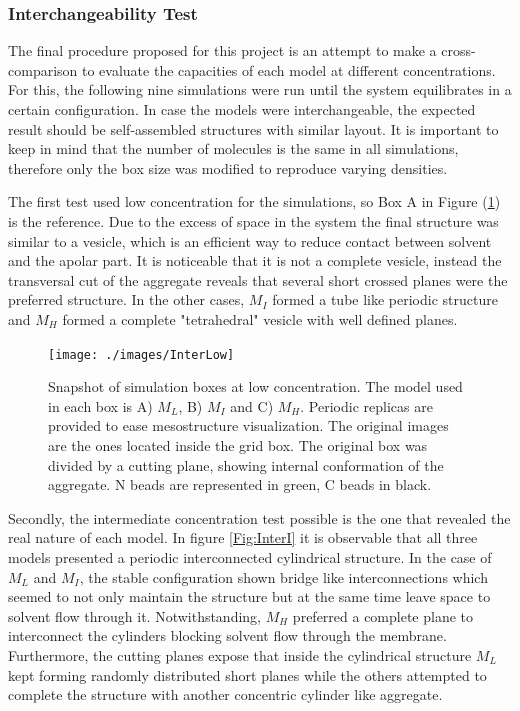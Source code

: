\documentclass[10pt,a4paper,twoside]{article}
\begin{document}
	
\subsubsection{Interchangeability Test }

The final procedure proposed for this project is an attempt to make a cross-comparison to evaluate the capacities of each model at different concentrations. For this, the following nine simulations were run until the system equilibrates in a certain configuration. In case the models were interchangeable, the expected result should be self-assembled structures with similar layout. It is important to keep in mind  that the number of molecules is the same in all simulations, therefore only the box size was modified to reproduce varying densities.

 The first test used low concentration for the simulations, so Box A in Figure (\ref{Fig:InterLow}) is the reference. Due to the excess of space in the system the final structure was similar to  a vesicle, which is an efficient way to reduce contact between solvent and the apolar part. It is noticeable that it is not a complete vesicle, instead the transversal cut of the aggregate reveals that several short crossed planes were the preferred structure. In the other cases, $M_I$ formed a tube like periodic structure and $M_H$ formed a complete "tetrahedral" vesicle with well defined planes.

\begin{figure}[H]
  \begin{center}
	\texttt{[image: ./images/InterLow]}
	\caption{Snapshot of simulation boxes at low concentration. The model used in each box is A) $M_L$, B) $M_I$ and C) $M_H$. Periodic replicas are provided to ease mesostructure visualization. The original images are the ones located inside the grid box. The original box was divided by a cutting plane, showing internal conformation of the aggregate.  N beads are represented in green, C beads in black.}
	\label{Fig:InterLow}
  \end{center}
\end{figure} 

Secondly, the intermediate concentration test possible is the one that revealed the real nature of each model. In figure \ref{Fig:InterI} it is observable that all three models presented a periodic interconnected cylindrical structure. In the case of $M_L$ and $M_I$, the stable configuration shown bridge like interconnections which seemed to not only maintain the structure but at the same time leave space to solvent flow through it. Notwithstanding, $M_H$ preferred a complete plane to interconnect the cylinders blocking solvent flow through the membrane. Furthermore, the cutting planes expose that inside the cylindrical structure $M_L$ kept forming randomly distributed short planes while the others attempted to complete the structure with another concentric cylinder like aggregate. 
\end{document}
